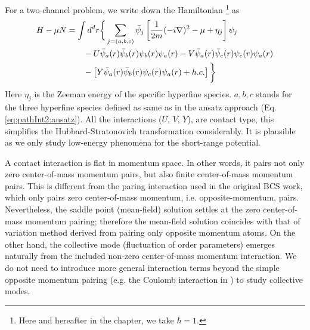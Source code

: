 For a two-channel problem, we write down the Hamiltonian \footnote{Here and hereafter in the chapter, we take $\hbar=1$.} as
\begin{equation}\label{eq:pathInt2:ham2}
\begin{split}
H-\mu{N}&=\int{d^{d}r}\bigg\{\sum_{j=(a,b,c)}\bar\psi_{j}\left[\frac{1}{2m}(-i\nabla)^{2}-\mu+\eta_{j}\right]\psi_{j}\\
	&\qquad-U\bar\psi_{a}(r)\bar\psi_{b}(r)\psi_{b}(r)\psi_{a}(r)-V\bar\psi_{a}(r)\bar\psi_{c}(r)\psi_{c}(r)\psi_{a}(r)\\
	&\qquad-\left[Y\bar\psi_{a}(r)\bar\psi_{b}(r)\psi_{c}(r)\psi_{a}(r)+h.c.\right]
	\bigg\}
\end{split}
\end{equation}
Here $\eta_{j}$ is the Zeeman energy of the specific hyperfine species.  $a,b,c$ stands for the three hyperfine species defined as  same as in the ansatz approach (Eq. \ref{eq:pathInt2:ansatz}).  All the interactions ($U$, $V$, $Y$), are contact type, this simplifies the Hubbard-Stratonovich transformation considerably.  It is plausible as we only study low-energy phenomena for the short-range potential. 

A contact interaction is  flat in momentum space. In other words, it pairs not only zero center-of-mass momentum pairs, but also finite center-of-mass momentum pairs. This is different from the paring interaction used in the original BCS work\cite{BCS}, which only pairs zero center-of-mass momentum, i.e. opposite-momentum, pairs.  Nevertheless, the saddle point (mean-field) solution settles at the zero center-of-mass momentum pairing; therefore the mean-field solution coincides with that of  variation method derived from pairing  only opposite momentum atoms.  On the other hand, the collective mode (fluctuation of order parameters) emerges naturally from the included non-zero center-of-mass momentum interaction.  We do not need to introduce more general interaction terms beyond the simple opposite momentum pairing (e.g. the Coulomb interaction in \cite{AndersonBCS}) to study collective modes.   

